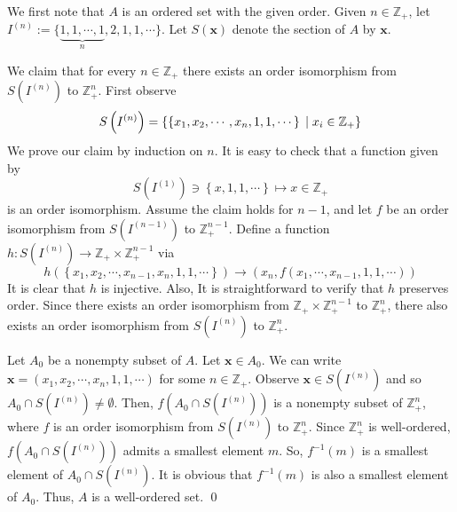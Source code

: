 \documentclass[a4paper,12pt]{article}
\begin{document}
\begin{sol}
	We first note that \( A \) is an ordered set with the given order.
	Given \( n\in \mathbb{Z}_{+} \),
	let
	\( I^{(n)}:=\{ \underbrace{1,1,\cdots,1}_{n},2,1,1,\cdots \} \).
	Let \( S(\bm{x}) \) denote the section of \( A \) by \( \bm{x} \).
	
	We claim that for every \( n \in \mathbb{Z}_{+} \)
	there exists an order isomorphism from \( S \left( I^{(n)} \right) \)
	to \( \mathbb{Z}_{+}^{n} \).
	First observe
	\begin{equation*}
		S \left( I^{(n)} \right)
		=
		\left\{  \left\{ x_1,x_2,\cdots,x_n,1,1,\cdots \right\} \;|\; x_i \in \mathbb{Z}_{+} \right\}
	\end{equation*}
	We prove our claim by induction on \( n \).
	It is easy to check that a function given by
	\begin{equation*}
		S \left( I^{(1)} \right) \ni \left\{ x,1,1,\cdots \right\}
		\mapsto x \in \mathbb{Z}_{+}
	\end{equation*}
	is an order isomorphism.
	Assume the claim holds for \( n-1 \),
	and let \( f \) be an order isomorphism from
	\( S \left( I^{(n-1)} \right) \) to \( \mathbb{Z}_{+}^{n-1} \).
	Define a function
	\( h: S \left( I^{(n)} \right) \to \mathbb{Z}_{+}\times \mathbb{Z}_{+}^{n-1}\)
	via
	\begin{equation*}
		h \left( \left\{ x_1,x_2,\cdots,x_{n-1},x_n,1,1,\cdots \right\} \right)
		\to
		\left( x_n, f(x_1,\cdots,x_{n-1},1,1,\cdots) \right)
	\end{equation*}
	It is clear that \( h \) is injective.
	Also, It is straightforward to verify that \( h \) preserves order.
	Since there exists an order isomorphism from
	\( \mathbb{Z}_{+}\times \mathbb{Z}_{+}^{n-1} \)
	to
	\( \mathbb{Z}_{+}^{n} \),
	there also exists an order isomorphism from
	\( S \left( I^{(n)} \right) \)
	to \( \mathbb{Z}_{+}^{n} \).
	
	Let \( A_0 \) be a nonempty subset of \( A \).
	Let \(  \bm{x} \in A_0 \).
	We can write \( \bm{x}=(x_1,x_2,\cdots,x_n,1,1,\cdots) \)
	for some \( n \in \mathbb{Z}_{+} \).
	Observe \( \bm{x} \in S \left( I^{(n)} \right) \)
	and so \( A_0 \cap  S \left( I^{(n)} \right) \neq \emptyset\).
	Then, \( f \left( A_0 \cap S \left( I^{(n)} \right) \right)\)
	is a nonempty subset of \( \mathbb{Z}_{+}^{n} \),
	where \( f \) is an order isomorphism from
	\( S\left( I^{(n)} \right) \) to \( \mathbb{Z}_{+}^{n} \).
	Since \( \mathbb{Z}_{+}^{n} \) is well-ordered,
	\( f \left( A_0 \cap S \left( I^{(n)} \right) \right)\)
	admits a smallest element \( m \).
	So, \( f ^{-1}(m) \) is a smallest element of
	\( A_0 \cap  S \left( I^{(n)} \right) \).
	It is obvious that \( f ^{-1}(m) \) is also a smallest element of \( A_0 \).
	Thus, \( A \) is a well-ordered set. 
	\qed\end{sol}
\end{document}
